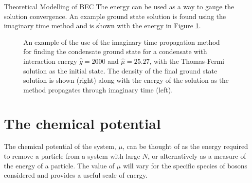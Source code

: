 \begin{chapter}{\label{cha:theoretical_model}Theoretical Modelling of BEC}
The energy can be used as a way to gauge the solution convergence. An example ground state solution is found using the imaginary time method and is shown with the energy in Figure \ref{fig_imagtimesolgs}. 
\begin{figure}
	\centering
  \hspace{0.04\linewidth}
	\caption{An example of the use of the imaginary time propagation method for finding the condensate ground state for a condensate with interaction energy $\hat{g}=2000$ and $\hat{\mu}=25.27$, with the Thomas-Fermi solution as the initial state. The density of the final ground state solution is shown (right) along with the energy of the solution as the method propagates through imaginary time (left).}\label{fig_imagtimesolgs}
\end{figure}

\section{\label{section:mu} The chemical potential}
The chemical potential of the system, $\mu$, can be thought of as the energy required to remove a particle from a system with large $N$, or alternatively as a measure of the energy of a particle. The value of $\mu$ will vary for the specific species of bosons considered and provides a useful scale of energy.


\end{chapter}
